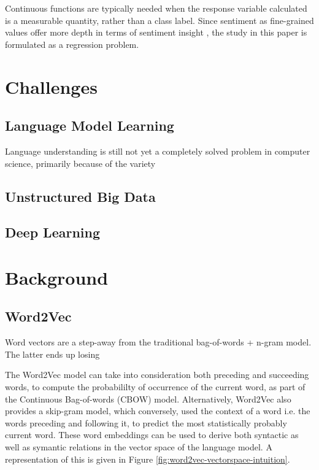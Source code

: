 \documentclass[conference]{IEEEtran}
\begin{document}
Continuous functions are typically needed when the response variable calculated is a measurable quantity, rather than a class label. Since sentiment as fine-grained values offer more depth in terms of sentiment insight \cite{drake2008sentiment}, the study in this paper is formulated as a regression problem.

\vspace{5mm}

\section{Challenges}

\subsection{Language Model Learning}
Language understanding is still not yet a completely solved problem in computer science, primarily because of the variety

\subsection{Unstructured Big Data}

\subsection{Deep Learning}


\vspace{5mm}

\section{Background}

\subsection{Word2Vec} \label{Word2Vec}
Word vectors are a step-away from the traditional bag-of-words + n-gram model. The latter ends up losing

The Word2Vec model\cite{mikolov2013efficient} can take into consideration both preceding and succeeding words, to compute the probabililty of occurrence of the current word, as part of the Continuous Bag-of-words (CBOW) model. Alternatively, Word2Vec also provides a skip-gram model\cite{mikolov2013distributed}, which conversely, used the context of a word i.e. the words preceding and following it, to predict the most statistically probably current word. These word embeddings can be used to derive both syntactic as well as symantic relations in the vector space of the language model. A representation of this is given in Figure \ref{fig:word2vec-vectorspace-intuition}.
\end{document}
